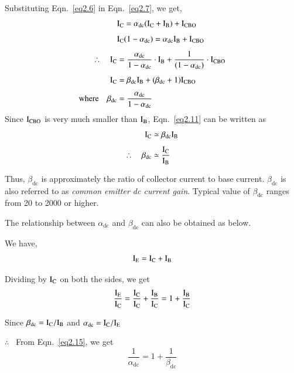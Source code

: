 Substituting Eqn.~\eqref{eq2.6} in Eqn.~\eqref{eq2.7}, we get,
\begin{align}
& \textrm{I}_{\textrm{C}}=\alpha_{\text{dc}}(\textrm{I}_{\textrm{C}}+\textrm{I}_{\textrm{B}})+\textrm{I}_{\text{CBO}}\notag\\[4pt]
& \textrm{I}_{\textrm{C}}(1-\alpha_{\text{dc}})=\alpha_{\text{dc}}\textrm{I}_{\textrm{B}}+\textrm{I}_{\text{CBO}}\notag\\[4pt]
\therefore\quad \textrm{I}_{\textrm{C}} &= \dfrac{\alpha_{\text{dc}}}{1-\alpha_{\text{dc}}}\cdot \textrm{I}_{\textrm{B}}+\frac{1}{(1-\alpha_{\text{dc}})}\cdot \textrm{I}_{\text{CBO}}\label{eq2.10}\\[4pt]
\textrm{I}_{\textrm{C}} &= \beta_{\text{dc}}\textrm{I}_{\textrm{B}}+(\beta_{\text{dc}}+1)\textrm{I}_{\text{CBO}}\label{eq2.11}\\[4pt]
\text{where}\quad \beta_{\text{dc}} &= \frac{\alpha_{\text{dc}}}{1-\alpha_{\text{dc}}}
\end{align}
Since $\textrm{I}_{\text{CBO}}$ is very much smaller than $\textrm{I}_{\textrm{B}}$, Eqn.~\eqref{eq2.11} can be written as
\begin{align}
\textrm{I}_{\textrm{C}} &\simeq \beta_{\text{dc}}\textrm{I}_{\textrm{B}}\label{eq2.12}\\[4pt]
\therefore\quad \beta_{\text{dc}} &\simeq \dfrac{\textrm{I}_{\textrm{C}}}{\textrm{I}_{\textrm{B}}}\label{eq2.13}
\end{align}

Thus, $\beta_{\text{dc}}$ is approximately the ratio of collector current to base current. $\beta_{\text{dc}}$ is also referred to as {\em common emitter dc current gain}. Typical value of $\beta_{\text{dc}}$ ranges from 20 to 2000 or higher.

The relationship between $\alpha_{\text{dc}}$ and $\beta_{\text{dc}}$ can also be obtained as below.

We have,
\begin{equation}
\textrm{I}_{\textrm{E}}=\textrm{I}_{\textrm{C}}+\textrm{I}_{\textrm{B}}\label{eq2.14}
\end{equation}

Dividing by $\textrm{I}_{\textrm{C}}$ on both the sides, we get
\begin{equation}
\frac{\textrm{I}_{\textrm{E}}}{\textrm{I}_{\textrm{C}}}=\frac{\textrm{I}_{\textrm{C}}}{\textrm{I}_{\textrm{C}}}+\frac{\textrm{I}_{\textrm{B}}}{\textrm{I}_{\textrm{C}}}=1+\frac{\textrm{I}_{\textrm{B}}}{\textrm{I}_{\textrm{C}}}\label{eq2.15}
\end{equation}

Since $\beta_{\text{dc}}=\textrm{I}_{\textrm{C}}/\textrm{I}_{\textrm{B}}$ and $\alpha_{\text{dc}}=\textrm{I}_{\textrm{C}}/\textrm{I}_{\textrm{E}}$

$\therefore$~ From Eqn.~\eqref{eq2.15}, we get
\begin{equation}
\frac{1}{\alpha_{\text{dc}}}=1+\frac{1}{\beta_{\text{dc}}}\label{eq2.17}
\end{equation}

